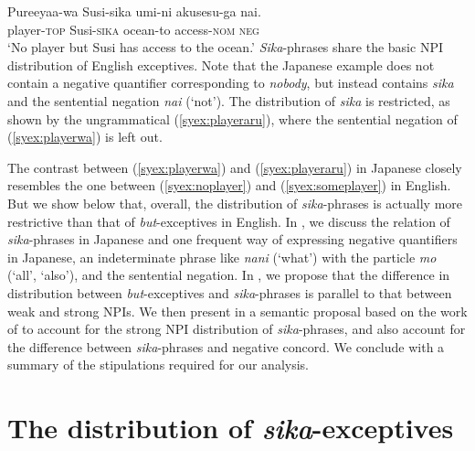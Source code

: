 \documentclass[output=paper]{langscibook}
\begin{document}
\ea \label{syex:playerwa}
\gll Pureeyaa-wa Susi-sika umi-ni akusesu-ga nai.\\
player-\textsc{top} Susi-\textsc{sika} ocean-to access-\textsc{nom} \textsc{neg}\\
\glt `No player but Susi has access to the ocean.'\z
%
\emph{Sika}-phrases share the basic NPI distribution of English exceptives.
Note that the Japanese example does not contain a negative quantifier corresponding to \emph{nobody}, but instead contains \emph{sika} and the sentential negation \emph{nai} (`not').  The distribution of \emph{sika} is restricted, as shown by the ungrammatical (\ref{syex:playeraru}), where the sentential negation of (\ref{syex:playerwa}) is left out.

\z


The contrast between (\ref{syex:playerwa}) and (\ref{syex:playeraru}) in Japanese closely resembles the one between (\ref{syex:noplayer}) and (\ref{syex:someplayer}) in English.
But we show below that, overall, the distribution of \emph{sika}-phrases is actually more restrictive than that of \emph{but}-exceptives in English. In , we discuss the relation of \emph{sika}-phrases in Japanese and one frequent way of expressing negative quantifiers in Japanese, an indeterminate phrase like \emph{nani} (`what') with the particle \emph{mo} (`all', `also'), and the sentential negation.
In , we propose that the difference in distribution between \emph{but}-exceptives and \emph{sika}-phrases is parallel to that between weak and strong NPIs.
We then present in  a semantic proposal based on the work of \citet{gajewski11a} to account for the strong NPI distribution of \emph{sika}-phrases, and also account for the difference between \emph{sika}-phrases and negative concord.  We conclude with a summary of the stipulations required for our analysis.



\section{The distribution of \emph{sika}-exceptives}\label{sysc:data}
\end{document}
